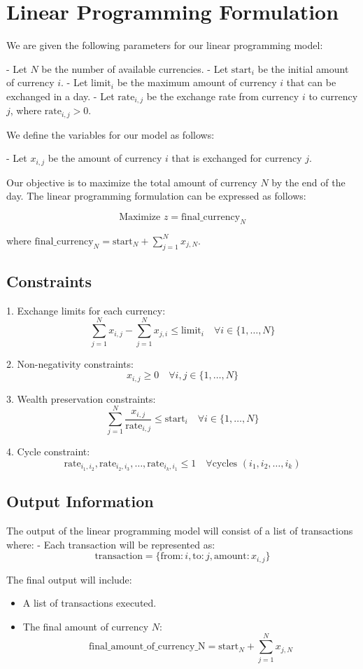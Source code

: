 \documentclass{article}
\begin{document}
\section*{Linear Programming Formulation}

We are given the following parameters for our linear programming model:

- Let \( N \) be the number of available currencies.
- Let \( \text{start}_i \) be the initial amount of currency \( i \).
- Let \( \text{limit}_i \) be the maximum amount of currency \( i \) that can be exchanged in a day.
- Let \( \text{rate}_{i,j} \) be the exchange rate from currency \( i \) to currency \( j \), where \( \text{rate}_{i,j} > 0 \).

We define the variables for our model as follows:

- Let \( x_{i,j} \) be the amount of currency \( i \) that is exchanged for currency \( j \).

Our objective is to maximize the total amount of currency \( N \) by the end of the day. The linear programming formulation can be expressed as follows:

\[
\text{Maximize } z = \text{final\_currency}_N
\]

where \( \text{final\_currency}_N = \text{start}_N + \sum_{j=1}^{N} x_{j,N} \).

\subsection*{Constraints}

1. Exchange limits for each currency:
\[
\sum_{j=1}^{N} x_{i,j} - \sum_{j=1}^{N} x_{j,i} \leq \text{limit}_i \quad \forall i \in \{1, \ldots, N\}
\]

2. Non-negativity constraints:
\[
x_{i,j} \geq 0 \quad \forall i, j \in \{1, \ldots, N\}
\]

3. Wealth preservation constraints:
\[
\sum_{j=1}^{N} \frac{x_{i,j}}{\text{rate}_{i,j}} \leq \text{start}_i \quad \forall i \in \{1, \ldots, N\}
\]

4. Cycle constraint:
\[
\text{rate}_{i_1,i_2}, \text{rate}_{i_2,i_3}, \ldots, \text{rate}_{i_k,i_1} \leq 1 \quad \forall \text{cycles } (i_1, i_2, \ldots, i_k)
\]

\subsection*{Output Information}

The output of the linear programming model will consist of a list of transactions where:
- Each transaction will be represented as:
\[
\text{transaction} = \{ \text{from}: i, \text{to}: j, \text{amount}: x_{i,j} \}
\]

The final output will include:
\begin{itemize}
    \item A list of transactions executed.
    \item The final amount of currency \( N \):
\[
\text{final\_amount\_of\_currency\_N} = \text{start}_N + \sum_{j=1}^{N} x_{j,N}
\]
\end{itemize}
\end{document}
